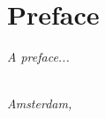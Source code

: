 \chapter*{Preface}

\emph{A preface...}

\begin{flushright}
{\makeatletter\itshape
    \@author \\
    Amsterdam, \monthname{} \the\year{}
\makeatother}
\end{flushright}
